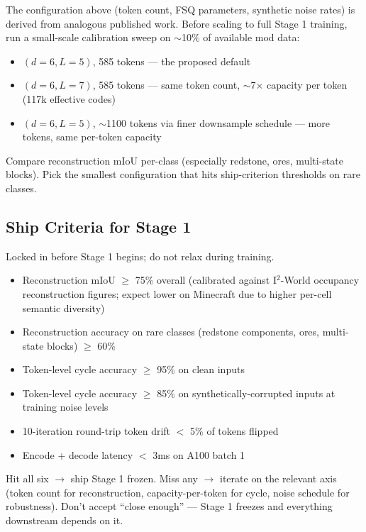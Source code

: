 \documentclass[11pt,a4paper]{article}
\begin{document}
The configuration above (token count, FSQ parameters, synthetic noise rates) is derived from analogous published work. Before scaling to full Stage 1 training, run a small-scale calibration sweep on $\sim$10\% of available mod data:

\begin{itemize}
  \item $(d=6, L=5)$, 585 tokens --- the proposed default
  \item $(d=6, L=7)$, 585 tokens --- same token count, $\sim$7$\times$ capacity per token (117k effective codes)
  \item $(d=6, L=5)$, $\sim$1100 tokens via finer downsample schedule --- more tokens, same per-token capacity
\end{itemize}

Compare reconstruction mIoU per-class (especially redstone, ores, multi-state blocks). Pick the smallest configuration that hits ship-criterion thresholds on rare classes.

\subsection{Ship Criteria for Stage 1}

Locked in before Stage 1 begins; do not relax during training.

\begin{itemize}
  \item Reconstruction mIoU $\geq$ 75\% overall (calibrated against I$^2$-World occupancy reconstruction figures; expect lower on Minecraft due to higher per-cell semantic diversity)
  \item Reconstruction accuracy on rare classes (redstone components, ores, multi-state blocks) $\geq$ 60\%
  \item Token-level cycle accuracy $\geq$ 95\% on clean inputs
  \item Token-level cycle accuracy $\geq$ 85\% on synthetically-corrupted inputs at training noise levels
  \item 10-iteration round-trip token drift $<$ 5\% of tokens flipped
  \item Encode + decode latency $<$ 3ms on A100 batch 1
\end{itemize}

Hit all six $\to$ ship Stage 1 frozen. Miss any $\to$ iterate on the relevant axis (token count for reconstruction, capacity-per-token for cycle, noise schedule for robustness). Don't accept ``close enough'' --- Stage 1 freezes and everything downstream depends on it.
\end{document}
